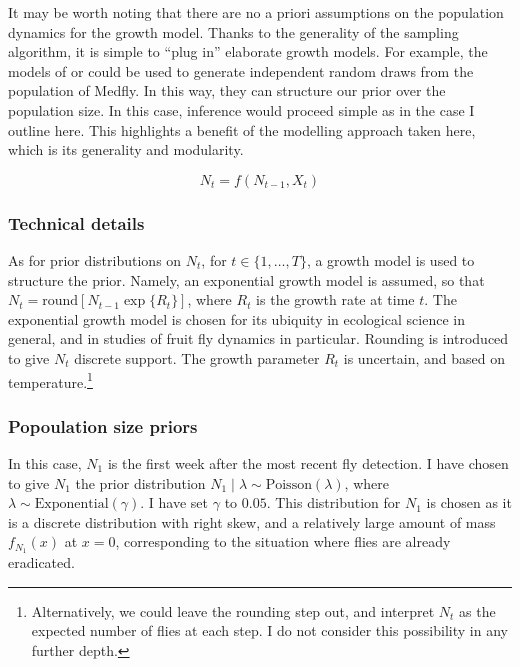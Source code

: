 \documentclass[
]{book}
\begin{document}
It may be worth noting that there are no a priori assumptions on the population dynamics for the growth model. Thanks to the generality of the sampling algorithm, it is simple to ``plug in'' elaborate growth models. For example, the models of \citet{lux2018} or \citet{manoukis2014} could be used to generate independent random draws from the population of Medfly. In this way, they can structure our prior over the population size. In this case, inference would proceed simple as in the case I outline here. This highlights a benefit of the modelling approach taken here, which is its generality and modularity.

\[
N_t = f(N_{t-1}, X_t)
\]

\hypertarget{technical-details}{%
\subsubsection{Technical details}\label{technical-details}}

As for prior distributions on \(N_t\), for \(t \in \{1, \ldots, T\}\), a growth model is used to structure the prior. Namely, an exponential growth model is assumed, so that \(N_t = \mathrm{round}[N_{t-1} \exp\{R_t\}]\), where \(R_t\) is the growth rate at time \(t\). The exponential growth model is chosen for its ubiquity in ecological science in general, and in studies of fruit fly dynamics in particular. Rounding is introduced to give \(N_t\) discrete support. The growth parameter \(R_t\) is uncertain, and based on temperature.\footnote{Alternatively, we could leave the rounding step out, and interpret \(N_t\) as the expected number of flies at each step. I do not consider this possibility in any further depth.}

\hypertarget{popoulation-size-priors}{%
\subsubsection{Popoulation size priors}\label{popoulation-size-priors}}

In this case, \(N_1\) is the first week after the most recent fly detection. I have chosen to give \(N_1\) the prior distribution \(N_1 \mid \lambda \sim \mathrm{Poisson}(\lambda)\), where \(\lambda \sim \mathrm{Exponential}(\gamma)\). I have set \(\gamma\) to \(0.05\). This distribution for \(N_1\) is chosen as it is a discrete distribution with right skew, and a relatively large amount of mass \(f_{N_1}(x)\) at \(x = 0\), corresponding to the situation where flies are already eradicated.
\end{document}
